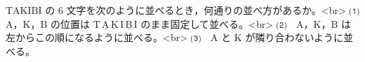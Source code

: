 $\mathrm{TAKIBI}$ の $6$ 文字を次のように並べるとき，何通りの並べ方があるか。<br>
⑴　$\mathrm{A}$，$\mathrm{K}$，$\mathrm{B}$ の位置は $\mathrm{T\,\underline{A}\,\underline{K}\,I\,\underline{B}\,I}$ のまま固定して並べる。<br>
⑵　$\mathrm{A}$，$\mathrm{K}$，$\mathrm{B}$ は左からこの順になるように並べる。<br>
⑶　$\mathrm{A}$ と $\mathrm{K}$ が隣り合わないように並べる。

